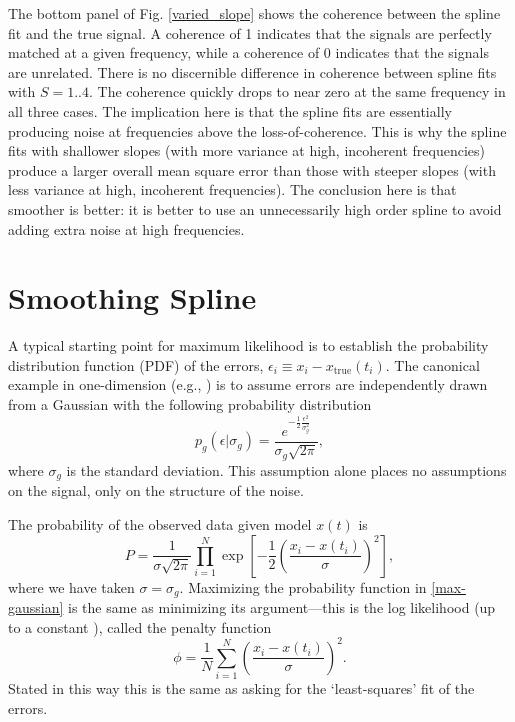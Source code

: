 \documentclass{ametsoc}
\begin{document}
The bottom panel of Fig. \ref{varied_slope} shows the coherence between the spline fit and the true signal. A coherence of 1 indicates that the signals are perfectly matched at a given frequency, while a coherence of 0 indicates that the signals are unrelated.  There is no discernible difference in coherence between spline fits with $S=1..4$. The coherence quickly drops to near zero at the same frequency in all three cases. The implication here is that the spline fits are essentially producing noise at frequencies above the loss-of-coherence. This is why the spline fits with shallower slopes (with more variance at high, incoherent frequencies) produce a larger overall mean square error than those with steeper slopes (with less variance at high, incoherent frequencies). The conclusion here is that smoother is better: it is better to use an unnecessarily high order spline to avoid adding extra noise at high frequencies.

%
\section{Smoothing Spline}
\label{sec:smoothing_spline}
%

A typical starting point for maximum likelihood is to establish the probability distribution function (PDF) of the errors, $\epsilon_i \equiv x_i - x_{\textrm{true}}(t_i)$. The canonical example in one-dimension (e.g., \citet{press1992-book}) is to assume errors are independently drawn from a Gaussian with the following probability distribution
\begin{equation}
\label{gaussian_pdf}
p_g(\epsilon|\sigma_g) = \frac{e^{-\frac{1}{2}\frac{\epsilon^2}{\sigma_g^2}} }{\sigma_g \sqrt{ 2 \pi}},
\end{equation}
where $\sigma_g$ is the standard deviation. This assumption alone places no assumptions on the signal, only on the structure of the noise.

The probability of the observed data given model $x(t)$ is
\begin{equation}
\label{max-gaussian}
P = \frac{1}{\sigma \sqrt{2 \pi}} \prod_{i=1}^{N}  \exp \left[ -\frac{1}{2} \left( \frac{x_i - x(t_i)}{\sigma} \right)^2 \right],
\end{equation}
where we have taken $\sigma=\sigma_g$. Maximizing the probability function in \eqref{max-gaussian} is the same as minimizing its argument---this is the log likelihood (up to a constant ), called the penalty function
\begin{equation}
\label{least-squares}
\phi = \frac{1}{N}\sum_{i=1}^{N} \left( \frac{x_i - x(t_i)}{\sigma} \right)^2 .
\end{equation}
Stated in this way this is the same as asking for the `least-squares' fit of the errors.
\end{document}
